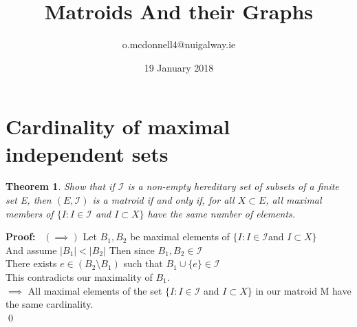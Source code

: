 \documentclass{article}
\title{Matroids And their Graphs}
\author{o.mcdonnell4@nuigalway.ie }
\date{19 January 2018}
\theoremstyle{plain}
\newtheorem{thm}{Theorem}[section]
\theoremstyle{definition}
\theoremstyle{remark}
\newcommand\Proof{%
    \textbf{Proof:}~%
}
\begin{document}
\maketitle
 
 \section{Cardinality of maximal independent sets}
 
 \begin{thm}
 Show that if $\mathcal{I}$ is a non-empty hereditary set of subsets of a finite set E, then $(E,\mathcal{I})$ is a matroid if and only if, for all $X \subset E$, all maximal members of $\{I : I \in \mathcal{I} $ and $ I \subset X\}$ have the same number of elements.
 \end{thm}
 
\noindent \Proof $(\implies)$ Let $B_1 , B_2$ be maximal elements of $\{I : I \in \mathcal{I} $and $ I \subset X\}$ \\
\noindent And assume $|B_1| < |B_2|$
Then since $B_1, B_2 \in \mathcal{I}$
\\
There exists $e \in (B_2 \setminus B_1)$ such that $B_1 \cup \{e\} \in \mathcal{I}$
\\
This contradicts our maximality of $B_1$.\\

 \noindent $\implies$ All maximal elements of the set $\{I : I \in \mathcal{I} $ and $ I \subset X\}$ in our matroid M have the same cardinality.
 \\ \qed
 
\end{document}
